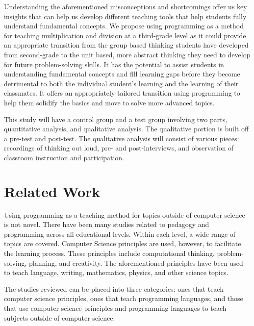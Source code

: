 \documentclass[12pt]{extarticle}
\begin{document}
Understanding the aforementioned misconceptions and shortcomings offer us key insights that can help us develop different teaching tools that help students fully understand fundamental concepts. We propose using programming as a method for teaching multiplication and division at a third-grade level as it could provide an appropriate transition from the group based thinking students have developed from second-grade to the unit based, more abstract thinking they need to develop for future problem-solving skills. It has the potential to assist students in understanding fundamental concepts and fill learning gaps before they become detrimental to both the individual student’s learning and the learning of their classmates. It offers an appropriately tailored transition using programming to help them solidify the basics and move to solve more advanced topics.

This study will have a control group and a test group involving two parts, quantitative analysis, and qualitative analysis. The qualitative portion is built off a pre-test and post-test. The qualitative analysis will consist of various pieces: recordings of thinking out loud, pre- and post-interviews, and observation of classroom instruction and participation.  

\section*{Related Work}
Using programming as a teaching method for topics outside of computer science is not novel. There have been many studies related to pedagogy and programming across all educational levels. Within each level, a wide range of topics are covered. Computer Science principles are used, however, to facilitate the learning process. These principles include computational thinking, problem-solving, planning, and creativity. The aforementioned principles have been used to teach language, writing, mathematics, physics, and other science topics. 

The studies reviewed can be placed into three categories: ones that teach computer science principles, ones that teach programming languages, and those that use computer science principles and programming languages to teach subjects outside of computer science. 
\end{document}
